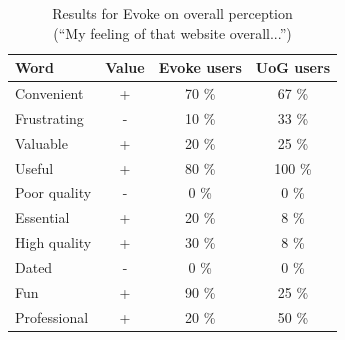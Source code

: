\begin{table}[htbp]
\begin{minipage}{.7\textwidth}
    \begin{tabular}{p{1in}ccc}
    \toprule
        \textbf{Word} & \textbf{Value} & \textbf{Evoke users} & \textbf{UoG users} \\ 
    \midrule
        Convenient & + & 70 \% & 67 \% \\
        Frustrating & - & 10 \% & 33 \% \\
        Valuable & + & 20 \% & 25 \% \\
        Useful & + & 80 \% & 100 \% \\
        Poor quality & - & 0 \% & 0 \% \\
        Essential & + & 20 \% & 8 \% \\
        High quality & + & 30 \% & 8 \% \\
        Dated & - & 0 \% & 0 \% \\
        Fun & + & 90 \% & 25 \% \\
        Professional & + & 20 \% & 50 \% \\
    \midrule
    \end{tabular}
    \caption[]{\label{table:Stolk2021x:eval:Evoke-overall}Results for Evoke on overall perception\\(``My feeling of that website overall...'')}
\end{minipage}
\begin{minipage}{.25\textwidth}
  
\end{minipage}
\end{table}

\endgroup
